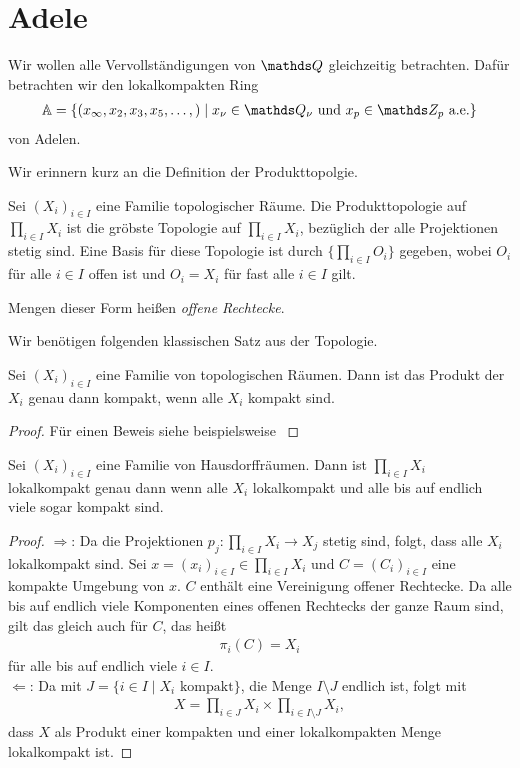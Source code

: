 \chapter{Adele}
Wir wollen alle Vervollständigungen von $\Q$ gleichzeitig betrachten.
Dafür betrachten wir den lokalkompakten Ring 
\begin{align*}
\A=\{(x_\infty,x_2,x_3,x_5,\dots,)\mid x_\nu \in \Q_\nu \text{ und } x_p \in \Z_p \text{ a.e.}\}
\end{align*}
von Adelen.

Wir erinnern kurz an die Definition der Produkttopolgie.

\begin{defi}
Sei $(X_i)_{i\in I}$ eine Familie topologischer Räume.
Die Produkttopologie auf $\prod_{i \in I} X_i$ ist die gröbste Topologie auf $\prod_{i \in I} X_i$, bezüglich der alle Projektionen stetig sind.
Eine Basis für diese Topologie ist durch $\{\prod_{i\in I}O_i\}$ gegeben, wobei $O_i$ für alle $i \in I$ offen ist und $O_i=X_i$ für fast alle $i \in I$ gilt.

Mengen dieser Form heißen \emph{offene Rechtecke}.
\end{defi}

Wir benötigen folgenden klassischen Satz aus der Topologie.
\begin{thm}[Tychonoff]
Sei $(X_i)_{i \in I}$ eine Familie von topologischen Räumen. Dann ist das Produkt der $X_i$ genau dann kompakt, wenn alle $X_i$ kompakt sind.
\end{thm}
\begin{proof}
Für einen Beweis siehe beispielsweise \cite[Theorem 7.7]{manetti}
\end{proof}

\begin{thm}
Sei $(X_i)_{i \in I}$ eine Familie von Hausdorffräumen. Dann ist $\prod_{i \in I} X_i$ lokalkompakt genau dann wenn alle $X_i$ lokalkompakt und alle bis auf endlich viele sogar kompakt sind.
\end{thm}
\begin{proof}
\glqq $\Rightarrow$\grqq : Da die Projektionen $p_j \colon \prod_{i \in I} X_i \to X_j$ stetig sind, folgt, dass alle $X_i$ lokalkompakt sind.
Sei $x=(x_i)_{i\in I} \in \prod_{i \in I} X_i$ und $C=(C_i)_{i \in I}$ eine kompakte Umgebung von $x$.
$C$ enthält eine Vereinigung offener Rechtecke. Da alle bis auf endlich viele Komponenten eines offenen Rechtecks der ganze Raum sind, gilt das gleich auch für $C$, das heißt
\begin{align*}
\pi_i(C)=X_i
\end{align*}
für alle bis auf endlich viele $i \in I$.\\
\glqq $\Leftarrow$\grqq : Da mit $J=\{i\in I \mid X_i \text{ kompakt}\}$, die Menge $I \setminus J$ endlich ist, folgt mit
\begin{align*}
X=\prod_{i \in J} X_i \times \prod_{i \in I\setminus J}X_i,
\end{align*}
dass $X$ als Produkt einer kompakten und einer lokalkompakten Menge lokalkompakt ist.
\end{proof}


